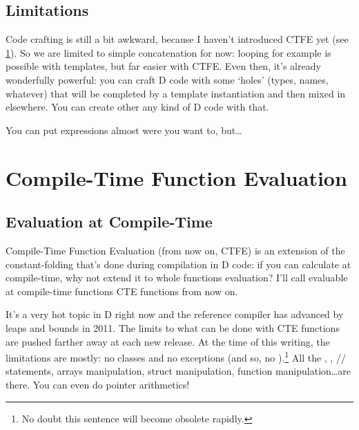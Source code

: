 \subsection{Limitations}\label{stringmixinslimitations}

Code crafting is still a bit awkward, because I haven't introduced CTFE yet (see \ref{ctfe}). So we are limited to simple concatenation for now: looping for example is possible with templates, but far easier with CTFE. Even then, it's already wonderfully powerful: you can craft D code with some `holes' (types, names, whatever) that will be completed by a template instantiation and then mixed in elsewhere. You can create other any kind of D code with that.

You can put \DD{()} expressions almost were you want to, but\ldots




\section{Compile-Time Function Evaluation} \label{ctfe}

\subsection{Evaluation at Compile-Time} \label{compiletimeevaluation}

Compile-Time Function Evaluation (from now on, CTFE) is an extension of the constant-folding that's done during compilation in D code: if you can calculate  at compile-time, why not extend it to whole functions evaluation? I'll call evaluable at compile-time functions CTE functions from now on.

It's a very hot topic in D right now and the reference compiler has advanced by leaps and bounds in 2011. The limits to what can be done with CTE functions are pushed farther away at each new release. At the time of this writing, the limitations are mostly: no classes and no exceptions (and so, no ).\footnote{No doubt this sentence will become obsolete rapidly.} All the , , // statements, arrays manipulation, struct manipulation, function manipulation\ldots are there. You can even do pointer arithmetics!


